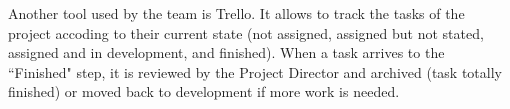 Another tool used by the team is Trello. It allows to track the tasks of the project accoding to their current state (not assigned, assigned but not stated, assigned and in development, and finished). When a task arrives to the ``Finished" step, it is reviewed by the Project Director and archived (task totally finished) or moved back to development if more work is needed.

\begin{comment}
[ToDo]: move this to Sysadmin doc
The {\tt prod} branch was created with:
\begin{verbatim}
git checkout -b prod
git push --set-upstream origin prod
\end{verbatim}

The .git/config ends up as:

\begin{verbatim}
[core]
	repositoryformatversion = 0
	filemode = true
	bare = false
	logallrefupdates = true
[remote "origin"]
	url = git@github.com:mcolom/ipolDevel.git
	fetch = +refs/heads/*:refs/remotes/origin/*
[branch "master"]
	remote = origin
	merge = refs/heads/master
[branch "prod"]
	remote = origin
	merge = refs/heads/prod
\end{verbatim}

To merge {\tt prod} with {\tt master:}
\begin{verbatim}
git checkout prod
git merge master
git push
git checkout master
\end{verbatim}
\end{comment}
